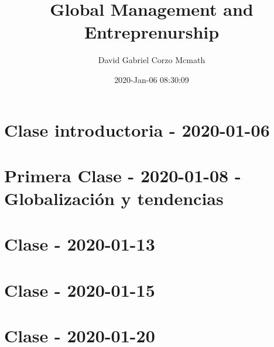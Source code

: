 \documentclass{book}
\title{Global Management and Entreprenurship}
\author{David Gabriel Corzo Mcmath}
\date{2020-Jan-06 08:30:09}
\begin{document}
\maketitle
\tableofcontents

\chapter{Clase introductoria - 2020-01-06}


\chapter{Primera Clase - 2020-01-08 - Globalización y tendencias}


\chapter{Clase - 2020-01-13}


\chapter{Clase - 2020-01-15}


\chapter{Clase - 2020-01-20}

\end{document}
